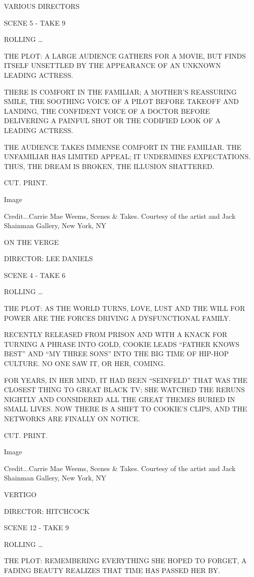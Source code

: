 VARIOUS DIRECTORS

SCENE 5 - TAKE 9

ROLLING \ldots{}

THE PLOT: A LARGE AUDIENCE GATHERS FOR A MOVIE, BUT FINDS ITSELF
UNSETTLED BY THE APPEARANCE OF AN UNKNOWN LEADING ACTRESS.

THERE IS COMFORT IN THE FAMILIAR; A MOTHER'S REASSURING SMILE, THE
SOOTHING VOICE OF A PILOT BEFORE TAKEOFF AND LANDING, THE CONFIDENT
VOICE OF A DOCTOR BEFORE DELIVERING A PAINFUL SHOT OR THE CODIFIED LOOK
OF A LEADING ACTRESS.

THE AUDIENCE TAKES IMMENSE COMFORT IN THE FAMILIAR. THE UNFAMILIAR HAS
LIMITED APPEAL; IT UNDERMINES EXPECTATIONS. THUS, THE DREAM IS BROKEN,
THE ILLUSION SHATTERED.

CUT. PRINT.

Image

Credit...Carrie Mae Weems, Scenes \& Takes. Courtesy of the artist and
Jack Shainman Gallery, New York, NY

ON THE VERGE

DIRECTOR: LEE DANIELS

SCENE 4 - TAKE 6

ROLLING \ldots{}

THE PLOT: AS THE WORLD TURNS, LOVE, LUST AND THE WILL FOR POWER ARE THE
FORCES DRIVING A DYSFUNCTIONAL FAMILY.

RECENTLY RELEASED FROM PRISON AND WITH A KNACK FOR TURNING A PHRASE INTO
GOLD, COOKIE LEADS ``FATHER KNOWS BEST'' AND ``MY THREE SONS'' INTO THE
BIG TIME OF HIP-HOP CULTURE. NO ONE SAW IT, OR HER, COMING.

FOR YEARS, IN HER MIND, IT HAD BEEN ``SEINFELD'' THAT WAS THE CLOSEST
THING TO GREAT BLACK TV; SHE WATCHED THE RERUNS NIGHTLY AND CONSIDERED
ALL THE GREAT THEMES BURIED IN SMALL LIVES. NOW THERE IS A SHIFT TO
COOKIE'S CLIPS, AND THE NETWORKS ARE FINALLY ON NOTICE.

CUT. PRINT.

Image

Credit...Carrie Mae Weems, Scenes \& Takes. Courtesy of the artist and
Jack Shainman Gallery, New York, NY

VERTIGO

DIRECTOR: HITCHCOCK

SCENE 12 - TAKE 9

ROLLING \ldots{}

THE PLOT: REMEMBERING EVERYTHING SHE HOPED TO FORGET, A FADING BEAUTY
REALIZES THAT TIME HAS PASSED HER BY.

